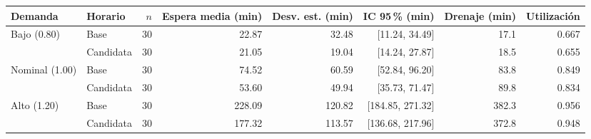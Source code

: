 \begin{tabular}{llrrrrrr}
\toprule
Demanda & Horario & $n$ & Espera media (min) & Desv. est. (min) & IC 95\,\% (min) & Drenaje (min) & Utilización \\
\midrule
Bajo (0.80) & Base & 30 & 22.87 & 32.48 & [11.24, 34.49] & 17.1 & 0.667 \\
 & Candidata & 30 & 21.05 & 19.04 & [14.24, 27.87] & 18.5 & 0.655 \\
Nominal (1.00) & Base & 30 & 74.52 & 60.59 & [52.84, 96.20] & 83.8 & 0.849 \\
 & Candidata & 30 & 53.60 & 49.94 & [35.73, 71.47] & 89.8 & 0.834 \\
Alto (1.20) & Base & 30 & 228.09 & 120.82 & [184.85, 271.32] & 382.3 & 0.956 \\
 & Candidata & 30 & 177.32 & 113.57 & [136.68, 217.96] & 372.8 & 0.948 \\
\bottomrule
\end{tabular}
